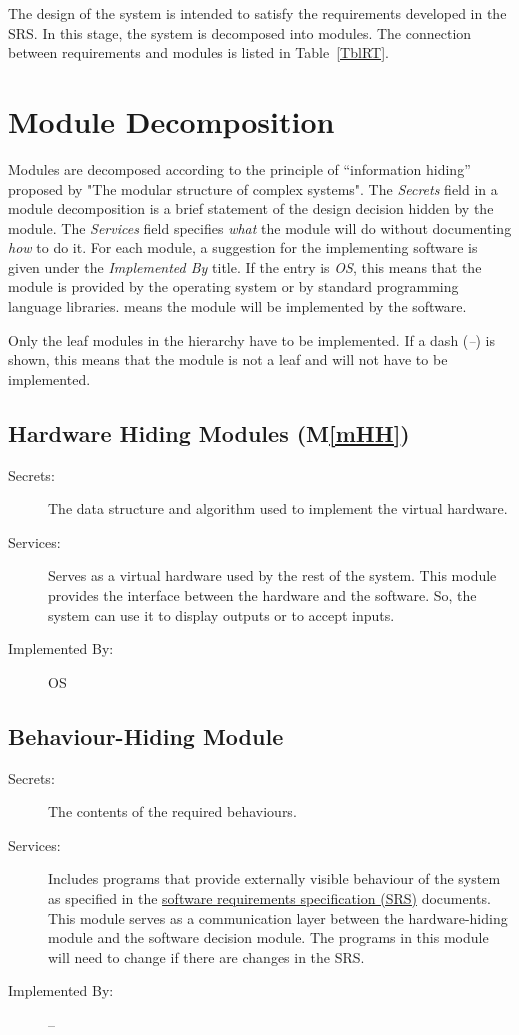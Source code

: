 \documentclass[12pt, titlepage]{article}
\newcommand{\mref}[1]{M\ref{#1}}
\begin{document}
The design of the system is intended to satisfy the requirements developed in
the SRS. In this stage, the system is decomposed into modules. The connection
between requirements and modules is listed in Table~\ref{TblRT}.

\section{Module Decomposition} \label{SecMD}

Modules are decomposed according to the principle of ``information hiding''
proposed by "The modular structure of complex systems". The \emph{Secrets} field in a module
decomposition is a brief statement of the design decision hidden by the
module. The \emph{Services} field specifies \emph{what} the module will do
without documenting \emph{how} to do it. For each module, a suggestion for the
implementing software is given under the \emph{Implemented By} title. If the
entry is \emph{OS}, this means that the module is provided by the operating
system or by standard programming language libraries.  \emph{\progname{}} means the
module will be implemented by the \progname{} software.

Only the leaf modules in the hierarchy have to be implemented. If a dash
(\emph{--}) is shown, this means that the module is not a leaf and will not have
to be implemented.

\subsection{Hardware Hiding Modules (\mref{mHH})}

\begin{description}
\item[Secrets:]The data structure and algorithm used to implement the virtual
  hardware.
\item[Services:]Serves as a virtual hardware used by the rest of the
  system. This module provides the interface between the hardware and the
  software. So, the system can use it to display outputs or to accept inputs.
\item[Implemented By:] OS
\end{description}

\subsection{Behaviour-Hiding Module}

\begin{description}
\item[Secrets:]The contents of the required behaviours.
\item[Services:]Includes programs that provide externally visible behaviour of
  the system as specified in the \href{https://github.com/WaqarAwan376/Damped_Harmonic_Oscillator-CAS741/tree/main/docs/SRS}{software requirements specification (SRS)}
  documents. This module serves as a communication layer between the
  hardware-hiding module and the software decision module. The programs in this
  module will need to change if there are changes in the SRS.
\item[Implemented By:] --
\end{description}
\end{document}
